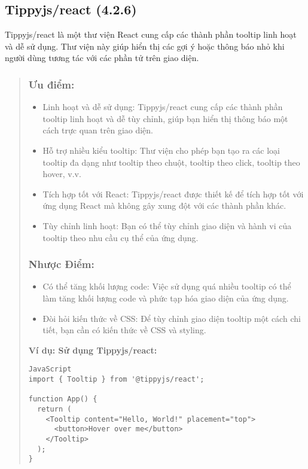 \subsection{Tippyjs/react (4.2.6)}
Tippyjs/react là một thư viện React cung cấp các thành phần tooltip linh hoạt và dễ sử dụng. Thư viện này giúp hiển thị các gợi ý hoặc thông báo nhỏ khi người dùng tương tác với các phần tử trên giao diện.

\begin{quote}
\subsubsection{Ưu điểm:}
\begin{itemize}
  \item Linh hoạt và dễ sử dụng: Tippyjs/react cung cấp các thành phần tooltip linh hoạt và dễ tùy chỉnh, giúp bạn hiển thị thông báo một cách trực quan trên giao diện.
  \item Hỗ trợ nhiều kiểu tooltip: Thư viện cho phép bạn tạo ra các loại tooltip đa dạng như tooltip theo chuột, tooltip theo click, tooltip theo hover, v.v.
  \item Tích hợp tốt với React: Tippyjs/react được thiết kế để tích hợp tốt với ứng dụng React mà không gây xung đột với các thành phần khác.
  \item Tùy chỉnh linh hoạt: Bạn có thể tùy chỉnh giao diện và hành vi của tooltip theo nhu cầu cụ thể của ứng dụng.
\end{itemize}

\subsubsection{Nhược Điểm:}
\begin{itemize}
  \item Có thể tăng khối lượng code: Việc sử dụng quá nhiều tooltip có thể làm tăng khối lượng code và phức tạp hóa giao diện của ứng dụng.
  \item Đòi hỏi kiến thức về CSS: Để tùy chỉnh giao diện tooltip một cách chi tiết, bạn cần có kiến thức về CSS và styling.
\end{itemize}

\textbf{Ví dụ: Sử dụng Tippyjs/react:}
\begin{lstlisting}
JavaScript
import { Tooltip } from '@tippyjs/react';

function App() {
  return (
    <Tooltip content="Hello, World!" placement="top">
      <button>Hover over me</button>
    </Tooltip>
  );
}
\end{lstlisting}
\end{quote}



